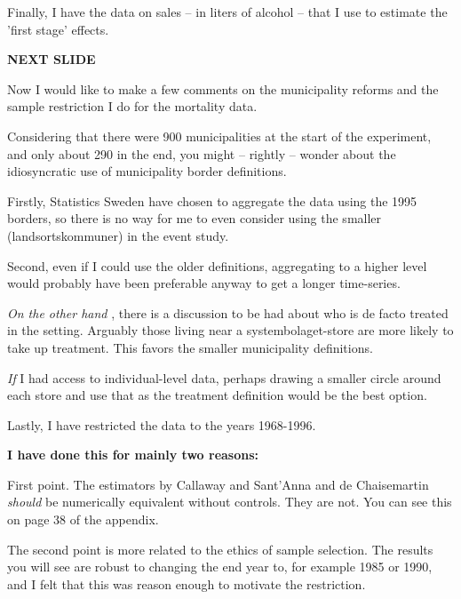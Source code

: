 \documentclass[12pt]{article}
\begin{document}
Finally, I have the data on sales -- in liters of alcohol -- that I use to estimate the 'first stage' effects.

 \textbf{NEXT SLIDE}

 Now I would like to make a few comments on the municipality reforms and the sample restriction I do for the mortality data. 

 Considering that there were 900 municipalities at the start of the experiment, and only about 290 in the end, you might -- rightly -- wonder about the idiosyncratic use of municipality border definitions. 

Firstly, Statistics Sweden have chosen to aggregate the data using the 1995 borders, so there is no way for me to even consider using the smaller (landsortskommuner) in the event study. 

Second, even if I could use the older definitions, aggregating to a higher level would probably have been preferable anyway to get a longer time-series. 

\emph{On the other hand} , there is a discussion to be had about who is de facto treated in the setting. Arguably those living near a systembolaget-store are more likely to take up treatment. This favors the smaller municipality definitions. 

\emph{If}  I had access to individual-level data, perhaps drawing a smaller circle around each store and use that as the treatment definition would be the best option.

Lastly, I have restricted the data to the years 1968-1996. 

 \textbf{I have done this for mainly two reasons:} 

First point. The estimators by Callaway and Sant'Anna and de Chaisemartin \emph{should} be numerically equivalent without controls. They are not. You can see this on page 38 of the appendix.


The second point is more related to the ethics of sample selection.  The results you will see are robust to changing the end year to, for example 1985 or 1990, and I felt that this was reason enough to motivate the restriction. 
\end{document}
